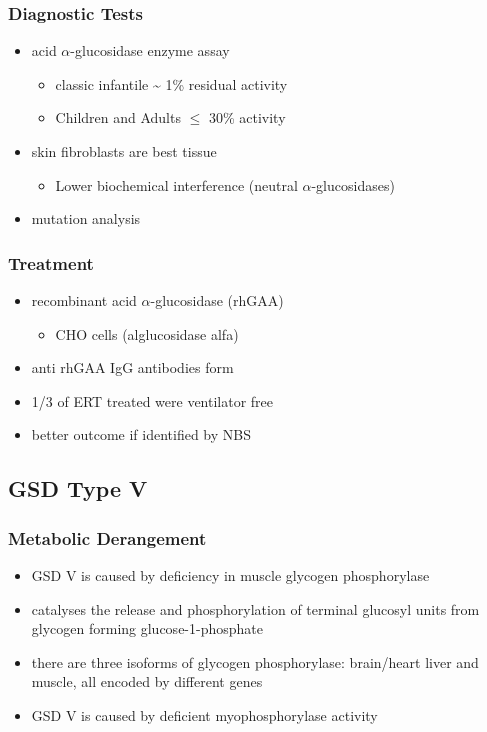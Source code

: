\documentclass{scrartcl}
\begin{document}
\subsubsection{Diagnostic Tests}
\label{sec:org2bbc61d}
\begin{itemize}
\item acid \(\alpha\)-glucosidase enzyme assay
\begin{itemize}
\item classic infantile \textasciitilde{} 1\% residual activity
\item Children and Adults \(\le\) 30\% activity
\end{itemize}
\item skin fibroblasts are best tissue
\begin{itemize}
\item Lower biochemical interference (neutral \(\alpha\)-glucosidases)
\end{itemize}
\item mutation analysis
\end{itemize}
\subsubsection{Treatment}
\label{sec:org88c09cc}
\begin{itemize}
\item recombinant acid \(\alpha\)-glucosidase (rhGAA)
\begin{itemize}
\item CHO cells (alglucosidase alfa)
\end{itemize}
\item anti rhGAA IgG antibodies form
\item 1/3 of ERT treated were ventilator free
\item better outcome if identified by NBS
\end{itemize}

\subsection{GSD Type V}
\label{sec:org6e4a094}
\subsubsection{Metabolic Derangement}
\label{sec:orgdffa41f}
\begin{itemize}
\item GSD V is caused by deficiency in muscle glycogen phosphorylase
\item catalyses the release and phosphorylation of terminal glucosyl units
from glycogen forming glucose-1-phosphate
\item there are three isoforms of glycogen phosphorylase: brain/heart
liver and muscle, all encoded by different genes
\item GSD V is caused by deficient myophosphorylase activity
\end{itemize}
\end{document}
